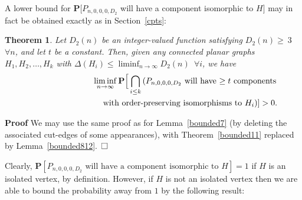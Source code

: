 \documentclass{article}
\newtheorem{Theorem}{Theorem}
\newtheorem{Proof of Theorem}{Proof of Theorem}
\begin{document}
A lower bound for $\mathbf{P}[P_{n,0,0,0,D_{2}}$ will have a component isomorphic to $H]$
may in fact be obtained exactly as in Section~\ref{cpts}:















\begin{Theorem} \label{bounded803}
Let $D_{2}(n)$ be an integer-valued function satisfying $D_{2}(n) \geq\!~\!\!3$~$\forall n$,
and let $t$ be a constant.
Then, given any connected planar graphs
$H_{1},H_{2}, \ldots, H_{k}$ 
with
$\Delta(H_{i}) \leq \liminf_{n \to \infty} D_{2}(n)$~$\forall i$,
we have
\begin{eqnarray*}
& & \liminf_{n \to \infty}
\mathbf{P}
\Big[\bigcap_{i \leq k} \left(\textrm{$P_{n,0,0,0,D_{2}}$ 
will have $\geq t$ components}\right. \\
& & \textrm{\phantom{wwwwwwwwwww}with order-preserving isomorphisms to $H_{i}$} ) ] 
> 0.
\end{eqnarray*}
\end{Theorem}
\textbf{Proof}
We may use the same proof as for Lemma~\ref{bounded7}
(by deleting the associated cut-edges of some appearances),
with Theorem~\ref{bounded11} replaced by Lemma~\ref{bounded812}.~$
\setlength{\unitlength}{.25cm}
\begin{picture}(1,1)
\put(0,0){\line(1,0){1}}
\put(0,0){\line(0,1){1}}
\put(1,1){\line(-1,0){1}}
\put(1,1){\line(0,-1){1}}
\end{picture}$ 

\phantom{p}













Clearly, 
$\mathbf{P}[P_{n,0,0,0,D_{2}} \textrm{ will have a component isomorphic to }H]=1$
if $H$ is an isolated vertex,
by definition.
However, if $H$ is not an isolated vertex then
we are able to bound the probability away from $1$ by the following result:
\end{document}
